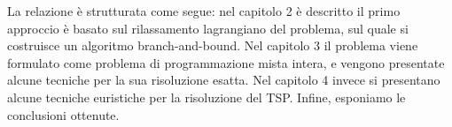 La relazione è strutturata come segue: nel capitolo 2 è descritto il primo approccio è basato sul rilassamento lagrangiano del problema, sul quale si costruisce un algoritmo branch-and-bound.  Nel capitolo 3 il problema viene formulato come problema di programmazione mista intera, e vengono presentate alcune tecniche per la sua risoluzione esatta. Nel capitolo 4 invece si presentano alcune tecniche euristiche per la risoluzione del TSP. Infine, esponiamo le conclusioni ottenute.
